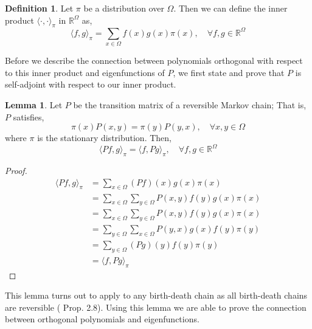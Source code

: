 \documentclass{article}
\theoremstyle{definition}
\newtheorem{definition}{Definition}
\theoremstyle{definition}
\theoremstyle{definition}
\newtheorem{lemma}{Lemma}
\theoremstyle{definition}
\theoremstyle{named}
\begin{document}
\begin{definition}
  Let $\pi$ be a distribution over $\Omega$. Then we can define the inner product $\langle\cdot ,\cdot \rangle_\pi$ in $\mathbb{R}^{\Omega}$ as,
  \[\langle f, g\rangle_\pi = \sum_{x \in \Omega}f(x)g(x)\pi(x), \quad  \forall f,g \in \mathbb{R}^\Omega\]
\end{definition}
\noindent Before we describe the connection between polynomials orthogonal with respect to this inner product and eigenfunctions of $P$, we first state and prove that $P$ is self-adjoint with respect to our inner product. 
\begin{lemma}
   \label{self_ajoint}
   Let $P$ be the transition matrix of a reversible Markov chain; That is, $P$ satisfies,
   \[\pi(x) P(x,y) = \pi(y)P(y,x),\quad \forall x,y\in \Omega\]
   where $\pi$ is the stationary distribution. Then,
   \[\langle Pf,g\rangle_\pi = \langle f,Pg\rangle_\pi,\quad \forall f,g \in \mathbb{R}^\Omega\]
   \begin{proof}
     \begin{align*}
      \langle Pf, g\rangle_\pi &= \sum_{x\in \Omega}(Pf)(x)g(x)\pi(x)\\
      &= \sum_{x\in \Omega}\sum_{y\in \Omega}P(x,y)f(y)g(x)\pi(x)\\
      &= \sum_{x\in \Omega}\sum_{y\in \Omega}P(x,y)f(y)g(x)\pi(x)\\
      &= \sum_{y\in \Omega}\sum_{x\in \Omega}P(y,x)g(x)f(y)\pi(y)\tag{By reversibility}\\
      &= \sum_{y\in \Omega}(Pg)(y)f(y)\pi(y)\\
      &=  \langle f, Pg\rangle_\pi
     \end{align*} 
   \end{proof}
\end{lemma}
\noindent This lemma turns out to apply to any birth-death chain as all birth-death chains are reversible (\cite{levin_markov_2017} Prop. 2.8). Using this lemma we are able to prove the connection between orthogonal polynomials and eigenfunctions.
\end{document}
